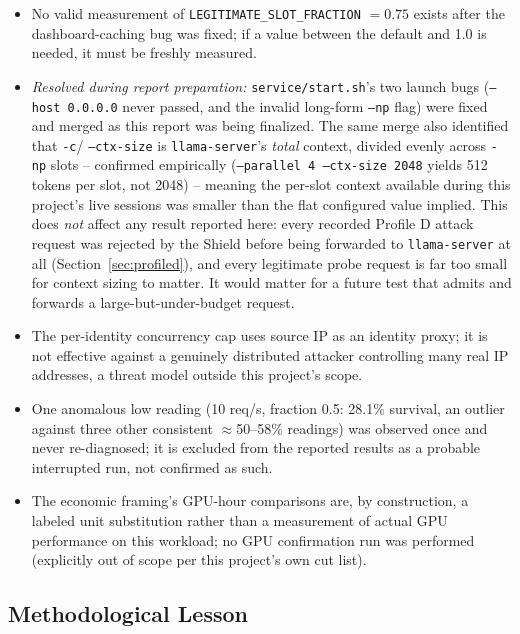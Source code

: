 \documentclass[11pt]{article}
\begin{document}
\begin{itemize}
    \item No valid measurement of \texttt{LEGITIMATE\_SLOT\_FRACTION} $=0.75$
    exists after the dashboard-caching bug was fixed; if a value between the
    default and 1.0 is needed, it must be freshly measured.
    \item \emph{Resolved during report preparation:} \texttt{service/start.sh}'s
    two launch bugs (\texttt{--host 0.0.0.0} never passed, and the invalid
    long-form \texttt{--np} flag) were fixed and merged as this report was
    being finalized. The same merge also identified that \texttt{-c}/
    \texttt{--ctx-size} is \texttt{llama-server}'s \emph{total} context,
    divided evenly across \texttt{-np} slots -- confirmed empirically
    (\texttt{--parallel 4 --ctx-size 2048} yields 512 tokens per slot, not
    2048) -- meaning the per-slot context available during this project's
    live sessions was smaller than the flat configured value implied. This
    does \emph{not} affect any result reported here: every recorded Profile D
    attack request was rejected by the Shield before being forwarded to
    \texttt{llama-server} at all (Section~\ref{sec:profiled}), and every
    legitimate probe request is far too small for context sizing to matter.
    It would matter for a future test that admits and forwards a
    large-but-under-budget request.
    \item The per-identity concurrency cap uses source IP as an identity
    proxy; it is not effective against a genuinely distributed attacker
    controlling many real IP addresses, a threat model outside this
    project's scope.
    \item One anomalous low reading (10 req/s, fraction 0.5: 28.1\% survival,
    an outlier against three other consistent $\approx$50--58\% readings) was
    observed once and never re-diagnosed; it is excluded from the reported
    results as a probable interrupted run, not confirmed as such.
    \item The economic framing's GPU-hour comparisons are, by construction, a
    labeled unit substitution rather than a measurement of actual GPU
    performance on this workload; no GPU confirmation run was performed
    (explicitly out of scope per this project's own cut list).
\end{itemize}

\subsection{Methodological Lesson}
\end{document}
